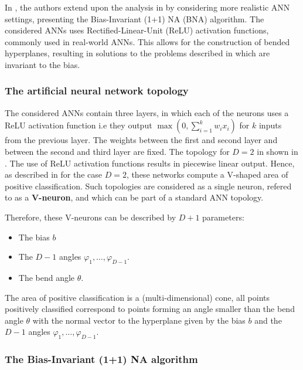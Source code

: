 In \cite{bna}, the authors extend upon the analysis in \cite{na} by considering more realistic ANN settings, presenting the Bias-Invariant (1+1) NA (BNA) algorithm.
The considered ANNs uses Rectified-Linear-Unit (ReLU) activation functions, commonly used in real-world ANNs.
This allows for the construction of bended hyperplanes, resulting in solutions to the problems described in  which are invariant
to the bias.

\subsubsection{The artificial neural network topology}

The considered ANNs contain three layers, in which each of the neurons uses a ReLU activation function i.e they output $\max(0, \sum_{i=1}^k w_i x_i)$ for
$k$ inputs from the previous layer.
The weights between the first and second layer and between the second and third layer are fixed. The topology for $D = 2$ in shown in .
The use of ReLU activation functions results in piecewise linear output. Hence, as described in  for the case $D = 2$, these networks compute a
V-shaped area of positive classification. Such topologies are considered as a single neuron, refered to as a \textbf{V-neuron}, and which can be part of a
standard ANN topology.

Therefore, these V-neurons can be described by $D + 1$ parameters:

\begin{itemize}
    \item The bias $b$
    \item The $D - 1$ angles $\varphi_1, \ldots, \varphi_{D-1}$.
    \item The bend angle $\theta$.
\end{itemize}

The area of positive classification is a (multi-dimensional) cone, all points positively classified correspond to points forming an angle smaller than the bend
angle $\theta$ with the normal vector to the hyperplane given by the bias $b$ and the $D -1$ angles $\varphi_1, \ldots, \varphi_{D-1}$.


\subsubsection{The Bias-Invariant (1+1) NA algorithm}

